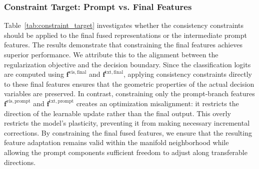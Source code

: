 \documentclass{article}
\theoremstyle{plain}
\theoremstyle{definition}
\theoremstyle{remark}
\begin{document}
	\subsubsection{Constraint Target: Prompt vs. Final Features}
	\begin{table}[h]
		\caption{Ablation study on the target of consistency constraints. We compare applying the constraints to the final fused representations versus applying them only to the intermediate prompt features. The results show that constraining the final representation yields better performance.}
		\label{tab:constraint_target}
		\centering
	\end{table}
	Table~\ref{tab:constraint_target} investigates whether the consistency constraints should be applied to the final fused representations or the intermediate prompt features. The results demonstrate that constraining the final features achieves superior performance. We attribute this to the alignment between the regularization objective and the decision boundary. Since the classification logits are computed using $\mathbf{f}^{\mathrm{vis,final}}$ and $\mathbf{f}^{\mathrm{txt,final}}$, applying consistency constraints directly to these final features ensures that the geometric properties of the actual decision variables are preserved. In contrast, constraining only the prompt-branch features $\mathbf{f}^{\mathrm{vis,prompt}}$ and $\mathbf{f}^{\mathrm{txt,prompt}}$ creates an optimization misalignment: it restricts the direction of the learnable update rather than the final output. This overly restricts the model's plasticity, preventing it from making necessary incremental corrections. By constraining the final fused features, we ensure that the resulting feature adaptation remains valid within the manifold neighborhood while allowing the prompt components sufficient freedom to adjust along transferable directions.
\end{document}
